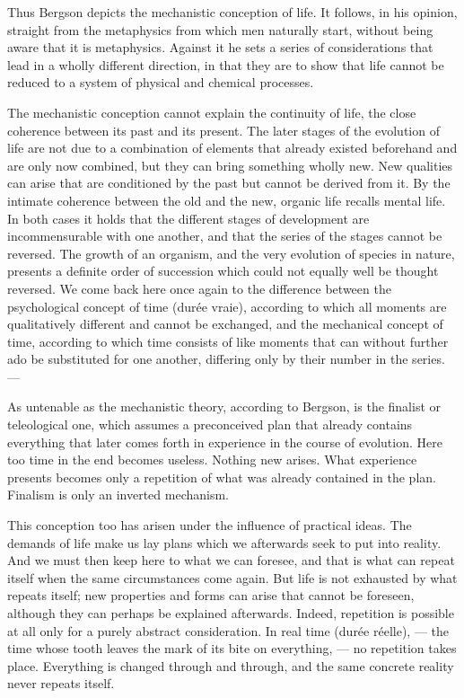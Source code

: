 \documentclass[12pt,a4paper,openany]{book}
\newcommand{\opage}[1]{\marginnote{\footnotesize\textit{[#1]}}}
\begin{document}
Thus Bergson depicts the mechanistic conception of life. It follows, in his opinion, straight from the metaphysics from which men naturally start, without being aware that it is metaphysics. Against it he sets a series of considerations that lead in a wholly different direction, in that they are to show that life cannot be reduced to a system of physical and chemical processes.

The mechanistic conception cannot explain the continuity of life, the close coherence between its past and its present. The later stages of the evolution of life are not due to a combination of elements that already existed beforehand and are only now combined, but they can bring something wholly new. New qualities can arise that are conditioned by the past but cannot be derived from it. By the intimate coherence between the old and the new, organic life recalls mental life. In both cases it holds that the different stages of development are incommensurable with one another, and that the series of the stages cannot be reversed. The growth of an organism, and the very evolution of species in nature, presents a definite order of succession which could not equally well be thought reversed. We come back here once again
\opage{38}to the difference between the psychological concept of time (durée vraie), according to which all moments are qualitatively different and cannot be exchanged, and the mechanical concept of time, according to which time consists of like moments that can without further ado be substituted for one another, differing only by their number in the series. ---

As untenable as the mechanistic theory, according to Bergson, is the finalist or teleological one, which assumes a preconceived plan that already contains everything that later comes forth in experience in the course of evolution. Here too time in the end becomes useless. Nothing new arises. What experience presents becomes only a repetition of what was already contained in the plan. Finalism is only an inverted mechanism.

This conception too has arisen under the influence of practical ideas. The demands of life make us lay plans which we afterwards seek to put into reality. And we must then keep here to what we can foresee, and that is what can repeat itself when the same circumstances come again. But life is not exhausted by what repeats itself; new properties and forms can arise that cannot be foreseen, although they can perhaps be explained afterwards. Indeed, repetition is possible at all only for a purely abstract consideration. In real time (durée réelle), --- the time whose tooth leaves the mark of its bite on everything, --- no repetition takes place. Everything is changed through and through, and the same concrete reality never repeats itself.
\end{document}
